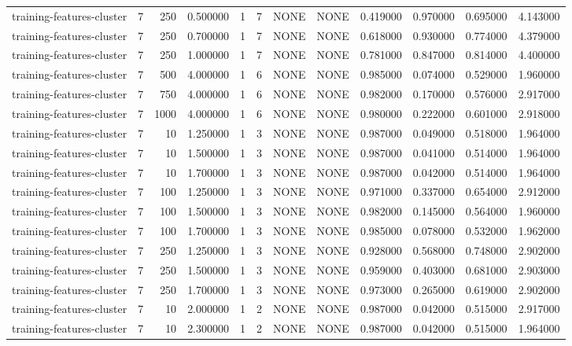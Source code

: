 \begin{tabular}{lrrrllllrrrr}
training-features-cluster & 7 & 250 & 0.500000 & 1 & 7 & NONE & NONE & 0.419000 & 0.970000 & 0.695000 & 4.143000 \\
training-features-cluster & 7 & 250 & 0.700000 & 1 & 7 & NONE & NONE & 0.618000 & 0.930000 & 0.774000 & 4.379000 \\
training-features-cluster & 7 & 250 & 1.000000 & 1 & 7 & NONE & NONE & 0.781000 & 0.847000 & 0.814000 & 4.400000 \\
training-features-cluster & 7 & 500 & 4.000000 & 1 & 6 & NONE & NONE & 0.985000 & 0.074000 & 0.529000 & 1.960000 \\
training-features-cluster & 7 & 750 & 4.000000 & 1 & 6 & NONE & NONE & 0.982000 & 0.170000 & 0.576000 & 2.917000 \\
training-features-cluster & 7 & 1000 & 4.000000 & 1 & 6 & NONE & NONE & 0.980000 & 0.222000 & 0.601000 & 2.918000 \\
training-features-cluster & 7 & 10 & 1.250000 & 1 & 3 & NONE & NONE & 0.987000 & 0.049000 & 0.518000 & 1.964000 \\
training-features-cluster & 7 & 10 & 1.500000 & 1 & 3 & NONE & NONE & 0.987000 & 0.041000 & 0.514000 & 1.964000 \\
training-features-cluster & 7 & 10 & 1.700000 & 1 & 3 & NONE & NONE & 0.987000 & 0.042000 & 0.514000 & 1.964000 \\
training-features-cluster & 7 & 100 & 1.250000 & 1 & 3 & NONE & NONE & 0.971000 & 0.337000 & 0.654000 & 2.912000 \\
training-features-cluster & 7 & 100 & 1.500000 & 1 & 3 & NONE & NONE & 0.982000 & 0.145000 & 0.564000 & 1.960000 \\
training-features-cluster & 7 & 100 & 1.700000 & 1 & 3 & NONE & NONE & 0.985000 & 0.078000 & 0.532000 & 1.962000 \\
training-features-cluster & 7 & 250 & 1.250000 & 1 & 3 & NONE & NONE & 0.928000 & 0.568000 & 0.748000 & 2.902000 \\
training-features-cluster & 7 & 250 & 1.500000 & 1 & 3 & NONE & NONE & 0.959000 & 0.403000 & 0.681000 & 2.903000 \\
training-features-cluster & 7 & 250 & 1.700000 & 1 & 3 & NONE & NONE & 0.973000 & 0.265000 & 0.619000 & 2.902000 \\
training-features-cluster & 7 & 10 & 2.000000 & 1 & 2 & NONE & NONE & 0.987000 & 0.042000 & 0.515000 & 2.917000 \\
training-features-cluster & 7 & 10 & 2.300000 & 1 & 2 & NONE & NONE & 0.987000 & 0.042000 & 0.515000 & 1.964000 \\

\end{tabular}
